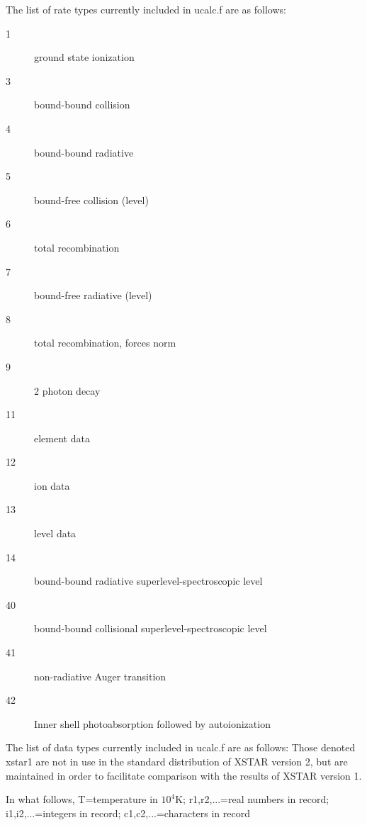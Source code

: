 The list of rate types currently included in ucalc.f are as follows: 


\begin{description}

 \item[1] ground state ionization      

 \item[3] bound-bound collision        

 \item[4] bound-bound radiative        

 \item[5] bound-free collision (level) 

 \item[6] total recombination          

 \item[7] bound-free radiative (level) 

 \item[8] total recombination, forces norm 

 \item[9] 2 photon decay                

 \item[11] element data                 

 \item[12] ion data                     

 \item[13] level data                   

 \item[14] bound-bound radiative superlevel-spectroscopic level     

 \item[40] bound-bound collisional superlevel-spectroscopic level     

 \item[41] non-radiative Auger transition

 \item[42] Inner shell photoabsorption followed by autoionization

\end{description}


The list of data types currently included in ucalc.f are as follows: 
Those denoted xstar1 are not in use in the standard distribution of XSTAR 
version 2, but are maintained in order to facilitate comparison with 
the results of XSTAR version 1.

In what follows, T=temperature in $10^4$K; r1,r2,...=real numbers in record;
i1,i2,...=integers in record; c1,c2,...=characters in record


